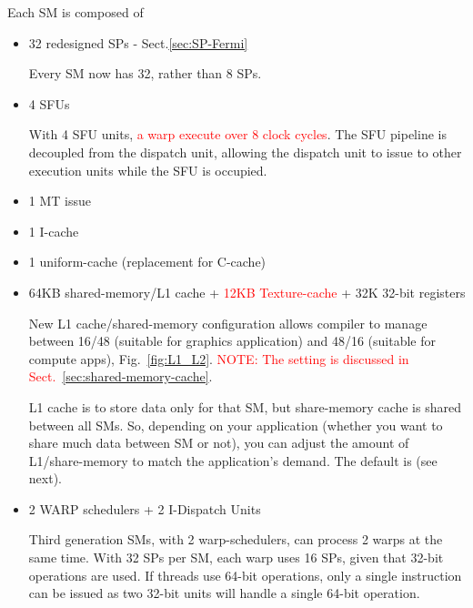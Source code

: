Each SM is composed of 
\begin{itemize}
  \item 32 redesigned SPs - Sect.\ref{sec:SP-Fermi}

Every SM now has 32, rather than 8 SPs. 
        
  \item 4 SFUs 

 With 4 SFU units,
    \textcolor{red}{a warp execute over 8 clock cycles}. The SFU
    pipeline is decoupled from the dispatch unit, allowing the
    dispatch unit to issue to other execution units while the SFU is
    occupied.

  \item 1 MT issue 

  \item 1 I-cache 
  
  \item  1 uniform-cache (replacement for C-cache) 
  
  \item 64KB shared-memory/L1 cache +
\textcolor{red}{12KB Texture-cache} + 32K 32-bit registers 

New L1 cache/shared-memory configuration allows compiler to
    manage between 16/48 (suitable for graphics application) and 48/16
    (suitable for compute apps), Fig.~\ref{fig:L1_L2}.
    \textcolor{red}{NOTE: The setting is discussed in Sect.~\ref{sec:shared-memory-cache}}.

L1 cache is to store data only for that SM, but share-memory cache is shared
between all SMs. So, depending on your application (whether you want to share
much data between SM or not), you can adjust the amount of L1/share-memory to
match the application's demand. The default is (see next).

  \item 2 WARP schedulers + 2 I-Dispatch Units 
 
  Third generation SMs, with 2 warp-schedulers, can process 2 warps
    at the same time. With 32 SPs per SM, each warp uses 16 SPs, given
    that 32-bit operations are used. If threads use 64-bit operations,
    only a single instruction can be issued as two 32-bit units will
    handle a single 64-bit operation.  


\end{itemize}
